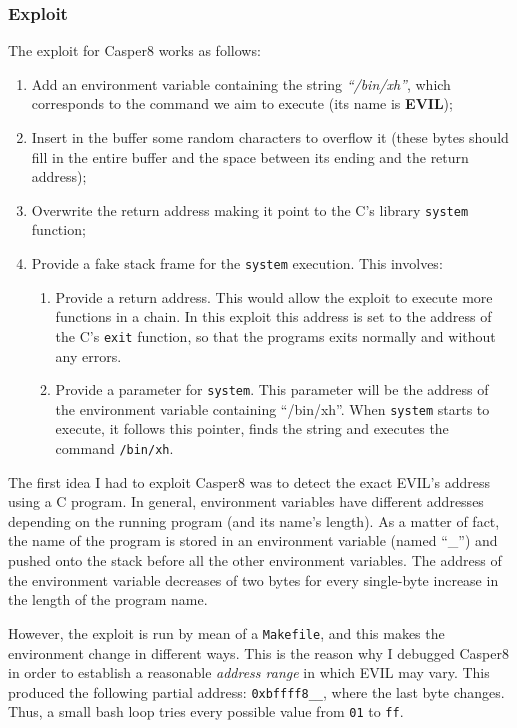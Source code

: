 \subsubsection{Exploit}
The exploit for Casper8 works as follows:
\begin{enumerate}
	\item Add an environment variable containing the string \textit{``/bin/xh''}, which corresponds to the command we aim to execute (its name is \textbf{EVIL});
	\item Insert in the buffer some random characters to overflow it (these bytes should fill in the entire buffer and the space between its ending and the return address);
	\item Overwrite the return address making it point to the C's library \texttt{system} function;
	\item Provide a fake stack frame for the \texttt{system} execution. This involves:
	\begin{enumerate}
		\item Provide a return address. This would allow the exploit to execute more functions in a chain. In this exploit this address is set to the address of the C's \texttt{exit} function, so that the programs exits normally and without any errors.
		\item Provide a parameter for \texttt{system}. This parameter will be the address of the environment variable containing ``/bin/xh''. When \texttt{system} starts to execute, it follows this pointer, finds the string and executes the command \texttt{/bin/xh}.
	\end{enumerate}
\end{enumerate}
The first idea I had to exploit Casper8 was to detect the exact EVIL's address using a C program. In general, environment variables have different addresses depending on the running program (and its name's length).  As a matter of fact, the name of the program is stored in an environment variable (named ``\_'') and pushed onto the stack before all the other environment variables. The address of the environment variable decreases of two bytes for every single-byte increase in the length of the program name. 

However, the exploit is run by mean of a \texttt{Makefile}, and this makes the environment change in different ways. This is the reason why I debugged Casper8 in order to establish a reasonable \textit{address range} in which EVIL may vary. This produced the following partial address: \texttt{0xbffff8\_\_}, where the last byte changes. Thus, a small bash loop tries every possible value from \texttt{01} to \texttt{ff}. 

